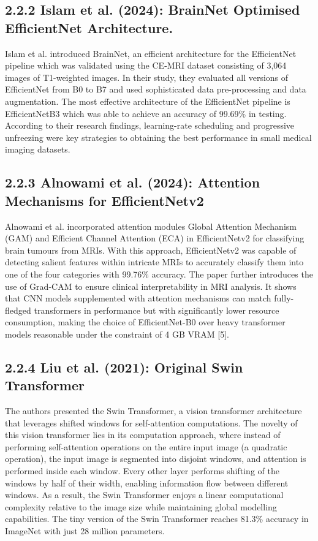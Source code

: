 \documentclass[12pt,a4paper,oneside]{report}
\begin{document}
\subsection{2.2.2 Islam et al. (2024): BrainNet Optimised EfficientNet Architecture.}
Islam et al. introduced BrainNet, an efficient architecture for the EfficientNet pipeline which was validated using the CE-MRI dataset consisting of 3,064 images of T1-weighted images. In their study, they evaluated all versions of EfficientNet from B0 to B7 and used sophisticated data pre-processing and data augmentation. The most effective architecture of the EfficientNet pipeline is EfficientNetB3 which was able to achieve an accuracy of 99.69\% in testing. According to their research findings, learning-rate scheduling and progressive unfreezing were key strategies to obtaining the best performance in small medical imaging datasets.
\subsection{2.2.3 Alnowami et al. (2024): Attention Mechanisms for EfficientNetv2}
Alnowami et al. incorporated attention modules Global Attention Mechanism (GAM) and Efficient Channel Attention (ECA) in EfficientNetv2 for classifying brain tumours from MRIs. With this approach, EfficientNetv2 was capable of detecting salient features within intricate MRIs to accurately classify them into one of the four categories with 99.76\% accuracy. The paper further introduces the use of Grad-CAM to ensure clinical interpretability in MRI analysis. It shows that CNN models supplemented with attention mechanisms can match fully-fledged transformers in performance but with significantly lower resource consumption, making the choice of EfficientNet-B0 over heavy transformer models reasonable under the constraint of 4 GB VRAM [5].
\subsection{2.2.4 Liu et al. (2021): Original Swin Transformer}
The authors presented the Swin Transformer, a vision transformer architecture that leverages shifted windows for self-attention computations. The novelty of this vision transformer lies in its computation approach, where instead of performing self-attention operations on the entire input image (a quadratic operation), the input image is segmented into disjoint windows, and attention is performed inside each window. Every other layer performs shifting of the windows by half of their width, enabling information flow between different windows. As a result, the Swin Transformer enjoys a linear computational complexity relative to the image size while maintaining global modelling capabilities. The tiny version of the Swin Transformer reaches 81.3\% accuracy in ImageNet with just 28 million parameters.
\end{document}
